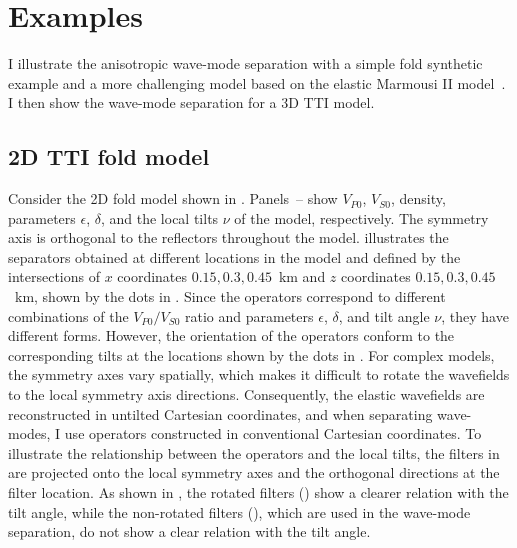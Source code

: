 \section{Examples}

I illustrate the anisotropic wave-mode separation with a simple fold
synthetic example and a more challenging model based on the elastic
Marmousi II model~\cite[]{marmousi}. I then show the wave-mode
separation for a 3D TTI model.


\subsection{2D TTI fold model}
Consider the 2D fold model shown in 
. 
Panels~-- show $V_{P0}$, $V_{S0}$,
density, parameters $\epsilon$, $\delta$, and the local tilts $\nu$ of
the model, respectively. The symmetry axis is orthogonal to the
reflectors throughout the model.
illustrates the separators obtained at different locations in the
model and defined by the intersections of $x$ coordinates $0.15, 0.3,
0.45$~km and $z$ coordinates $0.15, 0.3, 0.45$~km, shown by the dots
in . Since the operators correspond to different
combinations of the $V_{P0}/V_{S0}$ ratio and parameters $\epsilon$,
$\delta$, and tilt angle $\nu$, they have different forms. However, the
orientation of the operators conform to the corresponding tilts at the
locations shown by the dots in . For complex models, the
symmetry axes vary spatially, which makes it difficult to rotate the
wavefields to the local symmetry axis directions. Consequently, the
elastic wavefields are reconstructed in untilted Cartesian
coordinates, and when separating wave-modes, I use operators
constructed in conventional Cartesian coordinates. To illustrate the
relationship between the operators and the local tilts, the filters
in  are projected onto the local symmetry axes and the
orthogonal directions at the filter location. As shown
in , the rotated filters () show
a clearer relation with the tilt angle, while the non-rotated filters
(), which are used in the wave-mode separation, do not
show a clear relation with the tilt angle.


